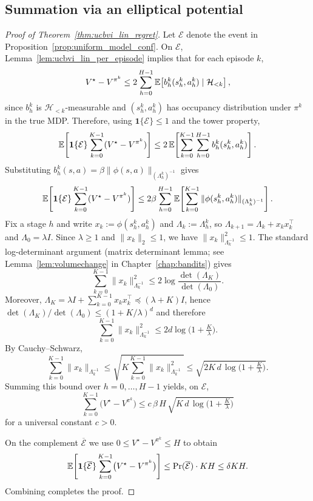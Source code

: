 \subsection{Summation via an elliptical potential}

\begin{proof}[Proof of Theorem~\ref{thm:ucbvi_lin_regret}]
Let $\mathcal E$ denote the event in Proposition~\ref{prop:uniform_model_conf}.
On $\mathcal E$, Lemma~\ref{lem:ucbvi_lin_per_episode} implies that for each episode $k$,
\[
V^\star - V^{\pi^k}
\le
2\sum_{h=0}^{H-1}\mathbb{E}\!\left[b_h^k(s_h^k,a_h^k)\mid \mathcal H_{<k}\right],
\]
since $b_h^k$ is $\mathcal H_{<k}$-measurable and $(s_h^k,a_h^k)$ has occupancy distribution under $\pi^k$ in the true MDP.
Therefore, using $\mathbf 1\{\mathcal E\}\le 1$ and the tower property,
\[
\mathbb{E}\!\left[\mathbf 1\{\mathcal E\}\sum_{k=0}^{K-1}(V^\star - V^{\pi^k})\right]
\le
2\,\mathbb{E}\!\left[\sum_{k=0}^{K-1}\sum_{h=0}^{H-1} b_h^k(s_h^k,a_h^k)\right].
\]
Substituting $b_h^k(s,a)=\beta\|\phi(s,a)\|_{(\Lambda_h^k)^{-1}}$ gives
\[
\mathbb{E}\!\left[\mathbf 1\{\mathcal E\}\sum_{k=0}^{K-1}(V^\star - V^{\pi^k})\right]
\le
2\beta\sum_{h=0}^{H-1}\mathbb{E}\!\left[\sum_{k=0}^{K-1}\|\phi(s_h^k,a_h^k)\|_{(\Lambda_h^k)^{-1}}\right].
\]
Fix a stage $h$ and write $x_k:=\phi(s_h^k,a_h^k)$ and $\Lambda_k:=\Lambda_h^k$, so
$\Lambda_{k+1}=\Lambda_k+x_kx_k^\top$ and $\Lambda_0=\lambda I$.  Since $\lambda\ge 1$ and $\|x_k\|_2\le 1$,
we have $\|x_k\|_{\Lambda_k^{-1}}^2\le 1$.  The standard log-determinant argument (matrix determinant lemma;
see Lemma~\ref{lem:volumechange} in Chapter~\ref{chap:bandits}) gives
\[
\sum_{k=0}^{K-1}\|x_k\|_{\Lambda_k^{-1}}^2
\le
2\log\!\frac{\det(\Lambda_K)}{\det(\Lambda_0)}.
\]
Moreover, $\Lambda_K=\lambda I+\sum_{k=0}^{K-1}x_kx_k^\top \preceq (\lambda+K)I$, hence
$\det(\Lambda_K)/\det(\Lambda_0)\le (1+K/\lambda)^d$ and therefore
\[
\sum_{k=0}^{K-1}\|x_k\|_{\Lambda_k^{-1}}^2
\le
2d\log\!\Big(1+\tfrac{K}{\lambda}\Big).
\]
By Cauchy--Schwarz,
\[
\sum_{k=0}^{K-1}\|x_k\|_{\Lambda_k^{-1}}
\le
\sqrt{K\sum_{k=0}^{K-1}\|x_k\|_{\Lambda_k^{-1}}^2}
\le
\sqrt{2K\,d\,\log\!\Big(1+\tfrac{K}{\lambda}\Big)}.
\]
Summing this bound over $h=0,\dots,H-1$ yields, on $\mathcal E$,
\[
\sum_{k=0}^{K-1}\bigl(V^\star - V^{\pi^k}\bigr)
\le
c\,\beta\,H\,\sqrt{K\,d\,\log\!\Big(1+\tfrac{K}{\lambda}\Big)}
\]
for a universal constant $c>0$.

On the complement $\overline{\mathcal E}$ we use $0\le V^\star - V^{\pi^k}\le H$ to obtain
\[
\mathbb{E}\!\left[\mathbf 1\{\overline{\mathcal E}\}\sum_{k=0}^{K-1}\bigl(V^\star - V^{\pi^k}\bigr)\right]
\le
\Pr(\overline{\mathcal E})\cdot KH
\le
\delta K H.
\]
Combining completes the proof.
\end{proof}

